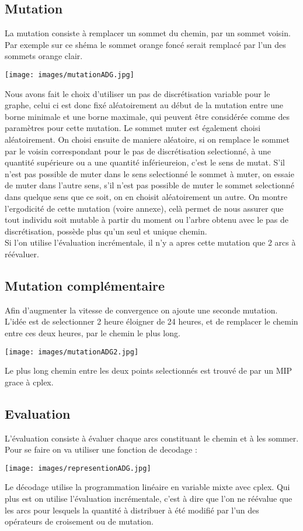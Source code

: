 \documentclass[a4paper]{report}
\begin{document}
\subsection*{Mutation}
La mutation consiste à remplacer un sommet du chemin, par un sommet voisin. Par exemple sur ce shéma le sommet orange foncé serait remplacé par l'un des sommets orange clair.
\begin{center}
  \texttt{[image: images/mutationADG.jpg]}
\end{center}
Nous avons fait le choix d'utiliser un pas de discrétisation variable pour le graphe, celui ci est donc fixé aléatoirement au début de la mutation entre une borne minimale et une borne maximale, qui peuvent être considérée comme des paramètres pour cette mutation. Le sommet muter est également choisi aléatoirement. On choisi ensuite de maniere aléatoire, si on remplace le sommet par le voisin correspondant pour le pas de discrétisation selectionné, à une quantité supérieure ou a une quantité inférieureion, c'est le sens de mutat. S'il n'est pas possible de muter dans le sens selectionné le sommet à muter, on essaie de muter dans l'autre sens, s'il n'est pas possible de muter le sommet selectionné dans quelque sens que ce soit, on en choisit aléatoirement un autre. On montre l'ergodicité de cette mutation (voire annexe), celà permet de nous assurer que tout individu soit mutable à partir du moment ou l'arbre obtenu avec le pas de discrétisation, possède plus qu'un seul et unique chemin.\\
Si l'on utilise l'évaluation incrémentale, il n'y a apres cette mutation que 2 arcs à réévaluer.
\subsection*{Mutation complémentaire}
Afin d'augmenter la vitesse de convergence on ajoute une seconde mutation. L'idée est de selectionner 2 heure éloigner de 24 heures, et de remplacer le chemin entre ces deux heures, par le chemin le plus long.
\begin{center}
  \texttt{[image: images/mutationADG2.jpg]}
\end{center}
Le plus long chemin entre les deux points selectionnés est trouvé de par un MIP grace à cplex.
\subsection*{Evaluation}
L'évaluation consiste à évaluer chaque arcs constituant le chemin et à les sommer. Pour se faire on va utiliser une fonction de decodage :
\begin{center}
  \texttt{[image: images/representionADG.jpg]}
\end{center} 
Le décodage utilise la programmation linéaire en variable mixte avec cplex. Qui plus est on utilise l'évaluation incrémentale, c'est à dire que l'on ne réévalue que les arcs pour lesquels la quantité à distribuer à été modifié par l'un des opérateurs de croisement ou de mutation.
\end{document}

